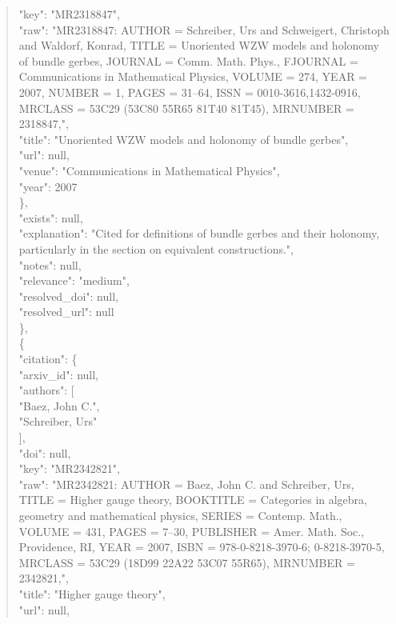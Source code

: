 \documentclass[11pt]{article}
\begin{document}
\begin{quote}
        "key": "MR2318847",\\
        "raw": "MR2318847: AUTHOR = Schreiber, Urs and Schweigert, Christoph and Waldorf, Konrad, TITLE = Unoriented WZW models and holonomy of bundle gerbes, JOURNAL = Comm. Math. Phys., FJOURNAL = Communications in Mathematical Physics, VOLUME = 274, YEAR = 2007, NUMBER = 1, PAGES = 31--64, ISSN = 0010-3616,1432-0916, MRCLASS = 53C29 (53C80 55R65 81T40 81T45), MRNUMBER = 2318847,",\\
        "title": "Unoriented WZW models and holonomy of bundle gerbes",\\
        "url": null,\\
        "venue": "Communications in Mathematical Physics",\\
        "year": 2007\\
      \},\\
      "exists": null,\\
      "explanation": "Cited for definitions of bundle gerbes and their holonomy, particularly in the section on equivalent constructions.",\\
      "notes": null,\\
      "relevance": "medium",\\
      "resolved\_doi": null,\\
      "resolved\_url": null\\
    \},\\
    \{\\
      "citation": \{\\
        "arxiv\_id": null,\\
        "authors": [\\
          "Baez, John C.",\\
          "Schreiber, Urs"\\
        ],\\
        "doi": null,\\
        "key": "MR2342821",\\
        "raw": "MR2342821: AUTHOR = Baez, John C. and Schreiber, Urs, TITLE = Higher gauge theory, BOOKTITLE = Categories in algebra, geometry and mathematical physics, SERIES = Contemp. Math., VOLUME = 431, PAGES = 7--30, PUBLISHER = Amer. Math. Soc., Providence, RI, YEAR = 2007, ISBN = 978-0-8218-3970-6; 0-8218-3970-5, MRCLASS = 53C29 (18D99 22A22 53C07 55R65), MRNUMBER = 2342821,",\\
        "title": "Higher gauge theory",\\
        "url": null,\\

\end{quote}
\end{document}
